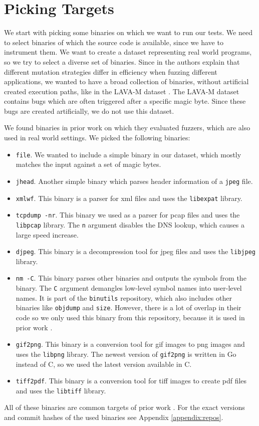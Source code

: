 \section{Picking Targets}
We start with picking some binaries on which we want to run our tests. We need to select binaries of which the source code is available, since we have to instrument them.
We want to create a dataset representing real world programs, so we try to select a diverse set of binaries. Since in \cite{lyu2019mopt} the authors explain that different mutation strategies differ in efficiency when fuzzing different applications, we wanted to have a broad collection of binaries, without artificial created execution paths, like in the LAVA-M dataset \cite{dolan2016lava}. The LAVA-M dataset contains bugs which are often triggered after a specific magic byte. Since these bugs are created artificially, we do not use this dataset. 

We found binaries in prior work on which they evaluated fuzzers, which are also used in real world settings.
We picked the following binaries:

\begin{itemize}
    \item \texttt{file}. We wanted to include a simple binary in our dataset, which mostly matches the input against a set of magic bytes.
    \item \texttt{jhead}. Another simple binary which parses header information of a \texttt{jpeg} file.
    \item \texttt{xmlwf}. This binary is a parser for xml files and uses the \texttt{libexpat} library.
    \item \texttt{tcpdump -nr}. This binary we used as a parser for pcap files and uses the \texttt{libpcap} library. The \texttt{n} argument disables the DNS lookup, which causes a large speed increase.
    \item \texttt{djpeg}. This binary is a decompression tool for jpeg files and uses the \texttt{libjpeg} library.
    \item \texttt{nm -C}. This binary parses other binaries and outputs the symbols from the binary. The \texttt{C} argument demangles low-level symbol names into user-level names. It is part of the \texttt{binutils} repository, which also includes other binaries like \texttt{objdump} and \texttt{size}. However, there is a lot of overlap in their code so we only used this binary from this repository, because it is used in prior work \cite{chen2018angora}. 
    \item \texttt{gif2png}. This binary is a conversion tool for gif images to png images and uses the \texttt{libpng} library. The newest version of \texttt{gif2png} is written in Go instead of C, so we used the latest version available in C.
    \item \texttt{tiff2pdf}. This binary is a conversion tool for tiff images to create pdf files and uses the \texttt{libtiff} library.
\end{itemize}
All of these binaries are common targets of prior work \cite{chen2018angora, she2019neuzz, han2019synfuzz, rawat2017vuzzer, yun2018qsym, liang2019deepfuzzer}.
For the exact versions and commit hashes of the used binaries see Appendix \ref{appendix:repos}.
